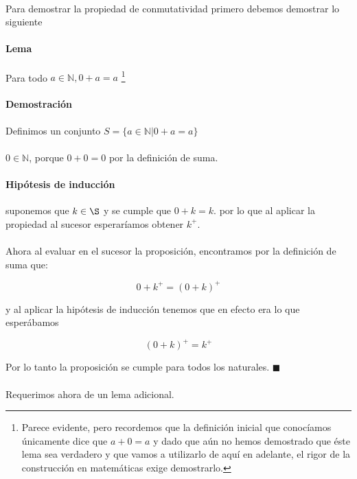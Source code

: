 \documentclass{article}
\begin{document}
\paragraph{} Para demostrar la propiedad de conmutatividad primero debemos demostrar lo siguiente

\paragraph{Lema} Para todo $a \in \mathbb{N}, 0 + a = a$ \footnote{Parece evidente, pero recordemos que la definición inicial que conocíamos únicamente dice que $a + 0 = a$ y dado que aún no hemos demostrado que éste lema sea verdadero y que vamos a utilizarlo de aquí en adelante, el rigor de la construcción en matemáticas exige demostrarlo.}

\paragraph{Demostración} Definimos un conjunto $S = \{a \in \mathbb{N}| 0 + a = a \}$

\paragraph{} $0 \in \mathbb{N}$, porque $0 + 0 = 0$ por la definición de suma.

\paragraph{Hipótesis de inducción} suponemos que $k \in \S$ y se cumple que $0 + k = k$. por lo que al aplicar la propiedad al sucesor esperaríamos obtener $k^+$.

\paragraph{}Ahora al evaluar en el sucesor la proposición, encontramos por la definición de suma que:

$$ 0 + k^+ = (0 + k)^+$$

y al aplicar la hipótesis de inducción tenemos que en efecto era lo que esperábamos

$$(0 + k)^+ = k^+$$

Por lo tanto la proposición se cumple para todos los naturales. $\blacksquare$

\paragraph{} Requerimos ahora de un lema adicional.
\end{document}
